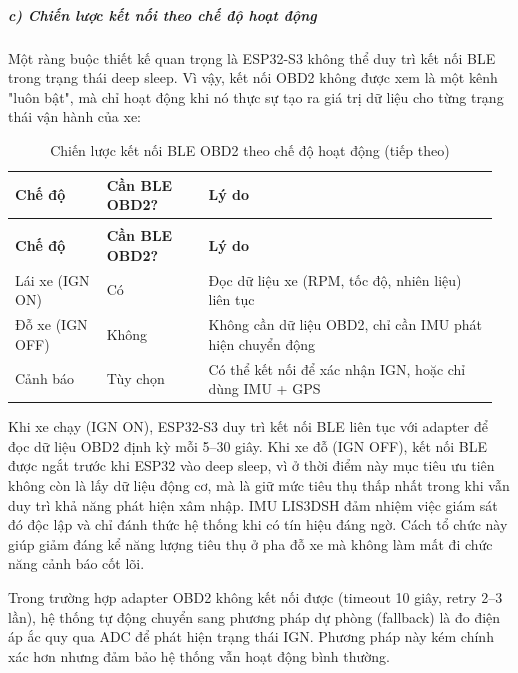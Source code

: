 \documentclass[a4paper]{extarticle}
\newcommand{\thesissettableid}[2]{%
  \renewcommand{\thetable}{#1}%
  \renewcommand{\theHtable}{#2}%
}
\begin{document}
\subparagraph{c) Chiến lược kết nối theo chế độ hoạt
động}\label{c-chiux1ebfn-lux1b0ux1ee3c-kux1ebft-nux1ed1i-theo-chux1ebf-ux111ux1ed9-houx1ea1t-ux111ux1ed9ng}

Một ràng buộc thiết kế quan trọng là ESP32-S3 không thể duy trì kết nối
BLE trong trạng thái deep sleep. Vì vậy, kết nối OBD2 không được xem là
một kênh "luôn bật", mà chỉ hoạt động khi nó thực sự tạo ra giá trị dữ liệu
cho từng trạng thái vận hành của xe:


{\thesissettableid{3.6}{tab-ch3-chien-luoc-ket-noi-ble-obd2-theo-che-o-hoat-ong}
\def\LTcaptype{table}
\begin{longtable}{|L{0.182\linewidth}|L{0.203\linewidth}|L{0.580\linewidth}|}
\caption{Chiến lược kết nối BLE OBD2 theo chế độ hoạt động}\label{tab:ch3-chien-luoc-ket-noi-ble-obd2-theo-che-o-hoat-ong}\\
\hline \textbf{Chế độ} & \textbf{Cần BLE OBD2?} & \textbf{Lý do} \\
\hline
\endfirsthead
\caption[]{Chiến lược kết nối BLE OBD2 theo chế độ hoạt động (tiếp theo)}\\
\hline \textbf{Chế độ} & \textbf{Cần BLE OBD2?} & \textbf{Lý do} \\
\hline
\endhead
\hline
\endfoot
\endlastfoot
Lái xe (IGN ON) & Có & Đọc dữ liệu xe (RPM, tốc độ, nhiên liệu) liên
tục \\\hline
Đỗ xe (IGN OFF) & Không & Không cần dữ liệu OBD2, chỉ cần IMU phát hiện
chuyển động \\\hline
Cảnh báo & Tùy chọn & Có thể kết nối để xác nhận IGN, hoặc chỉ dùng IMU
+ GPS \\\hline
\end{longtable}
}


Khi xe chạy (IGN ON), ESP32-S3 duy trì kết nối BLE liên tục với adapter để
đọc dữ liệu OBD2 định kỳ mỗi 5--30 giây. Khi xe đỗ (IGN OFF), kết nối BLE
được ngắt trước khi ESP32 vào deep sleep, vì ở thời điểm này mục tiêu ưu
tiên không còn là lấy dữ liệu động cơ, mà là giữ mức tiêu thụ thấp nhất
trong khi vẫn duy trì khả năng phát hiện xâm nhập. IMU LIS3DSH đảm nhiệm
việc giám sát đó độc lập và chỉ đánh thức hệ thống khi có tín hiệu đáng
ngờ. Cách tổ chức này giúp giảm đáng kể năng lượng tiêu thụ ở pha đỗ xe mà
không làm mất đi chức năng cảnh báo cốt lõi.

Trong trường hợp adapter OBD2 không kết nối được (timeout 10 giây, retry
2--3 lần), hệ thống tự động chuyển sang phương pháp dự phòng (fallback)
là đo điện áp ắc quy qua ADC để phát hiện trạng thái IGN. Phương pháp
này kém chính xác hơn nhưng đảm bảo hệ thống vẫn hoạt động bình thường.
\end{document}
